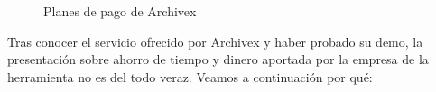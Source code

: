 \begin{figure}[H]
    \caption{Planes de pago de Archivex}
    \label{fig:archivex-precio}
\end{figure}

Tras conocer el servicio ofrecido por Archivex y haber probado su demo, la presentación sobre ahorro de tiempo y dinero aportada por la empresa de la herramienta no es del todo veraz. Veamos a continuación por qué:

